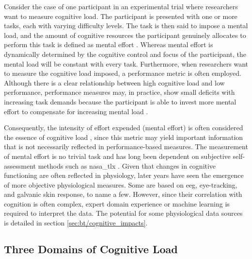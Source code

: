 Consider the case of one participant in an experimental trial where researchers want to measure cognitive load. The participant is presented with one or more tasks, each with varying difficulty levels. The task is then said to impose a mental load, and the amount of cognitive resources the participant genuinely allocates to perform this task is defined as mental effort \cite{paas1994B}. Whereas mental effort is dynamically determined by the cognitive control and focus of the participant, the mental load will be constant with every task. Furthermore, when researchers want to measure the cognitive load imposed, a performance metric is often employed. Although there is a clear relationship between high cognitive load and low performance, performance measures may, in practice, show small deficits with increasing task demands because the participant is able to invest more mental effort to compensate for increasing mental load \cite{tulga1980}.

Consequently, the intensity of effort expended (mental effort) is often considered the essence of cognitive load \cite{hamilton1979}, since this metric may yield important information that is not necessarily reflected in performance-based measures. The measurement of mental effort is no trivial task and has long been dependent on subjective self-assessment methods such as \acrfull{nasa_tlx} \cite{hart1988}. Given that changes in cognitive functioning are often reflected in physiology, later years have seen the emergence of more objective physiological measures. Some are based on \acrfull{eeg}, eye-tracking, and galvanic skin response, to name a few. However, since their correlation with cognition is often complex, expert domain experience or machine learning is required to interpret the data. The potential for some physiological data sources is detailed in section \ref{sec:bt/cognitive_impacts}.

\subsection{Three Domains of Cognitive Load} \label{sec:bt/CLT/domains}




